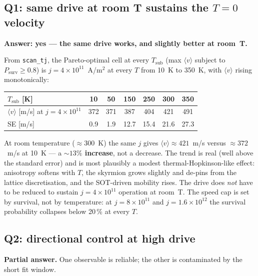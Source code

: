 \documentclass[11pt,a4paper]{article}
\begin{document}
\subsection{Q1: same drive at room T sustains the $T=0$ velocity}

\textbf{Answer: yes — the same drive works, and slightly better at room~T.}

From \texttt{scan\_tj}, the Pareto-optimal cell at every $T_\mathrm{sub}$
(max $\langle v \rangle$ subject to $P_\mathrm{surv} \ge 0.8$) is
$j = 4 \times 10^{11}$~A/m$^2$ at every $T$ from 10~K to 350~K, with
$\langle v \rangle$ rising monotonically:

\begin{table}[h]
\centering
\begin{tabular}{lcccccc}
\toprule
$T_\mathrm{sub}$ [K] & 10 & 50 & 150 & 250 & 300 & 350 \\
\midrule
$\langle v \rangle$ [m/s] at $j = 4 \times 10^{11}$
   & 372 & 371 & 387 & 404 & 421 & 491 \\
SE [m/s]
   & 0.9 & 1.9 & 12.7 & 15.4 & 21.6 & 27.3 \\
\bottomrule
\end{tabular}
\end{table}

At room temperature ($\approx 300$~K) the same $j$ gives
$\langle v \rangle \approx 421$~m/s versus $\approx 372$~m/s at 10~K — a
\textbf{$\sim 13\%$ increase}, not a decrease. The trend is real (well
above the standard error) and is most plausibly a modest
thermal-Hopkinson-like effect: anisotropy softens with $T$, the
skyrmion grows slightly and de-pins from the lattice discretisation,
and the SOT-driven mobility rises. The drive does \emph{not} have to
be reduced to sustain $j = 4 \times 10^{11}$ operation at room~T.
The speed cap is set by survival, not by temperature: at
$j = 8 \times 10^{11}$ and $j = 1.6 \times 10^{12}$ the survival
probability collapses below 20\,\% at every $T$.

\subsection{Q2: directional control at high drive}

\textbf{Partial answer.} One observable is reliable; the other is
contaminated by the short fit window.
\end{document}

